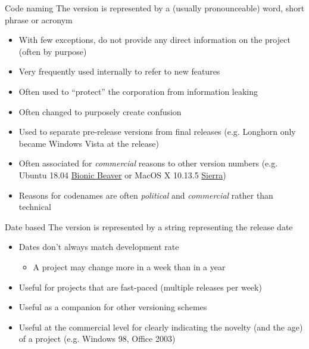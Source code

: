 \documentclass[presentation]{beamer}
\begin{document}
\begin{frame}{Code naming}
    The version is represented by a (usually pronounceable) word, short phrase or acronym
    \begin{itemize}
        \item With few exceptions, do not provide any direct information on the project (often by purpose)
        \item Very frequently used internally to refer to new features
        \item Often used to ``protect'' the corporation from information leaking
        \item Often changed to purposely create confusion
        \item Used to separate pre-release versions from final releases (e.g. Longhorn only became Windows Vista at the release)
        \item Often associated for \textit{commercial} reasons to other version numbers (e.g. Ubuntu 18.04 \underline{Bionic Beaver} or MacOS X 10.13.5 \underline{Sierra})
        \item Reasons for codenames are often \textit{political} and \textit{commercial} rather than technical
    \end{itemize}

\end{frame}

\begin{frame}{Date based}
    The version is represented by a string representing the release date
    \begin{itemize}
        \item Dates don't always match development rate
        \begin{itemize}
            \item A project may change more in a week than in a year
        \end{itemize}
        \item Useful for projects that are fast-paced (multiple releases per week)
        \item Useful as a companion for other versioning schemes
        \item Useful at the commercial level for clearly indicating the novelty (and the age) of a project (e.g. Windows 98, Office 2003)
    \end{itemize}
\end{frame}
\end{document}
